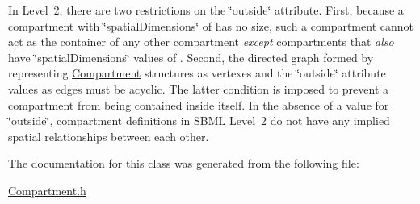 In Level~2, there are two restrictions on the \char`\"{}outside\char`\"{} attribute. First, because a compartment with \char`\"{}spatial\+Dimensions\char`\"{} of {} has no size, such a compartment cannot act as the container of any other compartment {\itshape except} compartments that {\itshape also} have \char`\"{}spatial\+Dimensions\char`\"{} values of {}. Second, the directed graph formed by representing \hyperlink{class_compartment}{Compartment} structures as vertexes and the \char`\"{}outside\char`\"{} attribute values as edges must be acyclic. The latter condition is imposed to prevent a compartment from being contained inside itself. In the absence of a value for \char`\"{}outside\char`\"{}, compartment definitions in S\+B\+ML Level~2 do not have any implied spatial relationships between each other. 

The documentation for this class was generated from the following file\+:\begin{DoxyCompactItemize}
\item 
\hyperlink{_compartment_8h}{Compartment.\+h}\end{DoxyCompactItemize}
